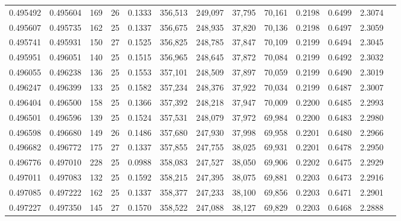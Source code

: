 \begin{tabular}{rrrrrrrrrrrrr}
0.495492 & 0.495604 &   169 &  26 &                                     0.1333 & 356,513 & 249,097 &  37,795 &  70,161 & 0.2198 & 0.6499 & 2.3074 \\
0.495607 & 0.495735 &   162 &  25 &                                     0.1337 & 356,675 & 248,935 &  37,820 &  70,136 & 0.2198 & 0.6497 & 2.3059 \\
0.495741 & 0.495931 &   150 &  27 &                                     0.1525 & 356,825 & 248,785 &  37,847 &  70,109 & 0.2199 & 0.6494 & 2.3045 \\
0.495951 & 0.496051 &   140 &  25 &                                     0.1515 & 356,965 & 248,645 &  37,872 &  70,084 & 0.2199 & 0.6492 & 2.3032 \\
0.496055 & 0.496238 &   136 &  25 &                                     0.1553 & 357,101 & 248,509 &  37,897 &  70,059 & 0.2199 & 0.6490 & 2.3019 \\
0.496247 & 0.496399 &   133 &  25 &                                     0.1582 & 357,234 & 248,376 &  37,922 &  70,034 & 0.2199 & 0.6487 & 2.3007 \\
0.496404 & 0.496500 &   158 &  25 &                                     0.1366 & 357,392 & 248,218 &  37,947 &  70,009 & 0.2200 & 0.6485 & 2.2993 \\
0.496501 & 0.496596 &   139 &  25 &                                     0.1524 & 357,531 & 248,079 &  37,972 &  69,984 & 0.2200 & 0.6483 & 2.2980 \\
0.496598 & 0.496680 &   149 &  26 &                                     0.1486 & 357,680 & 247,930 &  37,998 &  69,958 & 0.2201 & 0.6480 & 2.2966 \\
0.496682 & 0.496772 &   175 &  27 &                                     0.1337 & 357,855 & 247,755 &  38,025 &  69,931 & 0.2201 & 0.6478 & 2.2950 \\
0.496776 & 0.497010 &   228 &  25 &                                     0.0988 & 358,083 & 247,527 &  38,050 &  69,906 & 0.2202 & 0.6475 & 2.2929 \\
0.497011 & 0.497083 &   132 &  25 &                                     0.1592 & 358,215 & 247,395 &  38,075 &  69,881 & 0.2203 & 0.6473 & 2.2916 \\
0.497085 & 0.497222 &   162 &  25 &                                     0.1337 & 358,377 & 247,233 &  38,100 &  69,856 & 0.2203 & 0.6471 & 2.2901 \\
0.497227 & 0.497350 &   145 &  27 &                                     0.1570 & 358,522 & 247,088 &  38,127 &  69,829 & 0.2203 & 0.6468 & 2.2888 \\

\end{tabular}
